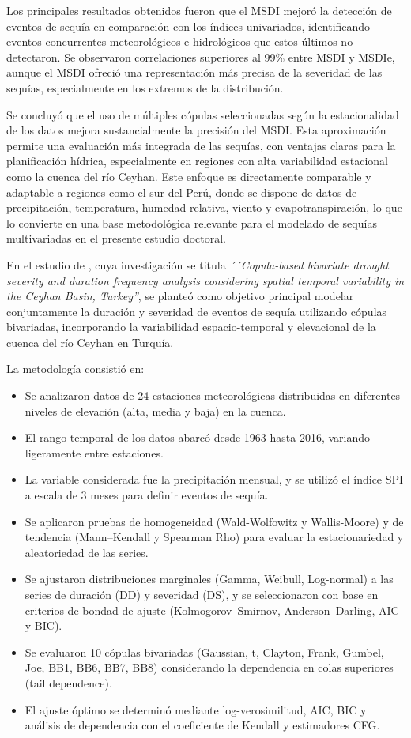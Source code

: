 Los principales resultados obtenidos fueron que el MSDI mejoró la detección de eventos de sequía en comparación con los índices univariados, identificando eventos concurrentes meteorológicos e hidrológicos que estos últimos no detectaron. Se observaron correlaciones superiores al 99\% entre MSDI y MSDIe, aunque el MSDI ofreció una representación más precisa de la severidad de las sequías, especialmente en los extremos de la distribución.

Se concluyó que el uso de múltiples cópulas seleccionadas según la estacionalidad de los datos mejora sustancialmente la precisión del MSDI. Esta aproximación permite una evaluación más integrada de las sequías, con ventajas claras para la planificación hídrica, especialmente en regiones con alta variabilidad estacional como la cuenca del río Ceyhan. Este enfoque es directamente comparable y adaptable a regiones como el sur del Perú, donde se dispone de datos de precipitación, temperatura, humedad relativa, viento y evapotranspiración, lo que lo convierte en una base metodológica relevante para el modelado de sequías multivariadas en el presente estudio doctoral.


En el estudio de \textcite{Esit2023}, cuya investigación se titula \textit{´´Copula-based bivariate drought severity and duration frequency analysis considering spatial temporal variability in the Ceyhan Basin, Turkey”}, se planteó como objetivo principal modelar conjuntamente la duración y severidad de eventos de sequía utilizando cópulas bivariadas, incorporando la variabilidad espacio-temporal y elevacional de la cuenca del río Ceyhan en Turquía.

La metodología consistió en:
\begin{itemize}
    \item Se analizaron datos de 24 estaciones meteorológicas distribuidas en diferentes niveles de elevación (alta, media y baja) en la cuenca.
    \item El rango temporal de los datos abarcó desde 1963 hasta 2016, variando ligeramente entre estaciones.
    \item La variable considerada fue la precipitación mensual, y se utilizó el índice SPI a escala de 3 meses para definir eventos de sequía.
    \item Se aplicaron pruebas de homogeneidad (Wald-Wolfowitz y Wallis-Moore) y de tendencia (Mann–Kendall y Spearman Rho) para evaluar la estacionariedad y aleatoriedad de las series.
    \item Se ajustaron distribuciones marginales (Gamma, Weibull, Log-normal) a las series de duración (DD) y severidad (DS), y se seleccionaron con base en criterios de bondad de ajuste (Kolmogorov–Smirnov, Anderson–Darling, AIC y BIC).
    \item Se evaluaron 10 cópulas bivariadas (Gaussian, t, Clayton, Frank, Gumbel, Joe, BB1, BB6, BB7, BB8) considerando la dependencia en colas superiores (tail dependence).
    \item El ajuste óptimo se determinó mediante log-verosimilitud, AIC, BIC y análisis de dependencia con el coeficiente de Kendall y estimadores CFG.
\end{itemize}

